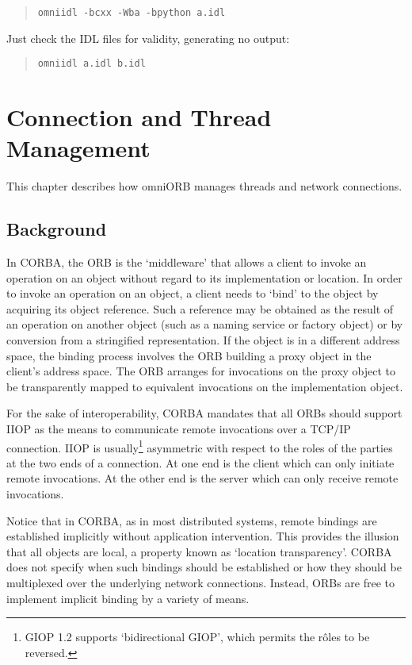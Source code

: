 \documentclass[11pt,oneside,a4paper]{book}
\newcommand{\cmdline}[1]{\texttt{#1}}
\begin{document}
\begin{quote}
\cmdline{omniidl -bcxx -Wba -bpython a.idl}
\end{quote}

\noindent Just check the IDL files for validity, generating no output:

\begin{quote}
\cmdline{omniidl a.idl b.idl}
\end{quote}




\chapter{Connection and Thread Management}
\label{chap:connections}


This chapter describes how omniORB manages threads and network
connections.

\section{Background}

In CORBA, the ORB is the `middleware' that allows a client to invoke
an operation on an object without regard to its implementation or
location. In order to invoke an operation on an object, a client needs
to `bind' to the object by acquiring its object reference. Such a
reference may be obtained as the result of an operation on another
object (such as a naming service or factory object) or by conversion
from a stringified representation. If the object is in a different
address space, the binding process involves the ORB building a proxy
object in the client's address space. The ORB arranges for invocations
on the proxy object to be transparently mapped to equivalent
invocations on the implementation object.

For the sake of interoperability, CORBA mandates that all ORBs should
support IIOP as the means to communicate remote invocations over a
TCP/IP connection. IIOP is usually\footnote{GIOP 1.2 supports
`bidirectional GIOP', which permits the r\^oles to be reversed.}
asymmetric with respect to the roles of the parties at the two ends of
a connection. At one end is the client which can only initiate remote
invocations. At the other end is the server which can only receive
remote invocations.

Notice that in CORBA, as in most distributed systems, remote bindings
are established implicitly without application intervention. This
provides the illusion that all objects are local, a property known as
`location transparency'. CORBA does not specify when such bindings
should be established or how they should be multiplexed over the
underlying network connections. Instead, ORBs are free to implement
implicit binding by a variety of means.
\end{document}
